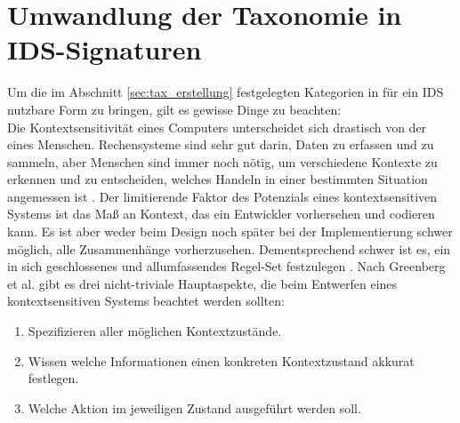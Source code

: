 \section{Umwandlung der Taxonomie in IDS-Signaturen} 
Um die im Abschnitt \ref{sec:tax_erstellung} festgelegten Kategorien in für ein IDS nutzbare Form zu bringen, gilt es gewisse Dinge zu beachten:\\ Die Kontextsensitivität eines Computers unterscheidet sich drastisch von der eines Menschen. Rechensysteme sind sehr gut darin, Daten zu erfassen und zu sammeln, aber Menschen sind immer noch nötig, um verschiedene Kontexte zu erkennen und zu entscheiden, welches Handeln in einer bestimmten Situation angemessen ist \cite{dey_understanding_2001}.
Der limitierende Faktor des Potenzials eines kontextsensitiven Systems ist das Maß an Kontext, das ein Entwickler vorhersehen und codieren kann.
Es ist aber weder beim Design noch später bei der Implementierung schwer möglich, alle Zusammenhänge vorherzusehen. Dementsprechend schwer ist es, ein in sich geschlossenes und allumfassendes Regel-Set festzulegen \cite{perera_context_2014}.
Nach Greenberg et al. \cite{greenberg2001context} gibt es drei nicht-triviale Hauptaspekte, die beim Entwerfen eines kontextsensitiven Systems beachtet werden sollten:
\begin{enumerate}
\item{Spezifizieren aller möglichen Kontextzustände.}
\item{Wissen welche Informationen einen konkreten Kontextzustand akkurat festlegen.}
\item{Welche Aktion im jeweiligen Zustand ausgeführt werden soll.}
\end{enumerate}

